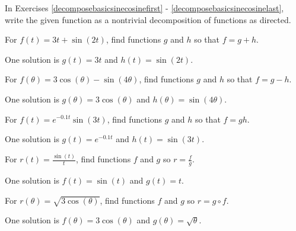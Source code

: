\documentclass{ximera}
\begin{document}
\begin{question}
    
In Exercises \ref{decomposebasicsinecosinefirst} - \ref{decomposebasicsinecosinelast}, write the given function as a nontrivial decomposition of functions as directed.

\begin{problem}\label{decomposebasicsinecosinefirst}
    For $f(t) = 3t + \sin(2t)$, find functions $g$ and $h$ so that $f=g+h$.

\begin{solution}
One solution is $g(t) = 3t$ and $h(t) = \sin(2t)$.
\end{solution}
\end{problem}

\begin{problem}
    For $f(\theta) = 3\cos(\theta) - \sin(4\theta)$, find functions $g$ and $h$ so that $f=g-h$.

\begin{solution}
One solution is $g(\theta) = 3 \cos(\theta)$ and $h(\theta) = \sin(4 \theta)$.
\end{solution}
\end{problem}

\begin{problem}
    For $f(t) = e^{-0.1t} \sin(3t)$, find functions $g$ and $h$ so that $f=gh$.
    
\begin{solution}
One solution is $g(t) =  e^{-0.1t}$ and $h(t) = \sin(3t)$.
\end{solution}
\end{problem}


\begin{problem}
    For $r(t) = \frac{\sin(t)}{t}$, find functions $f$ and $g$ so $r = \frac{f}{g}$.

\begin{solution}
One solution is $f(t) = \sin(t)$ and $g(t) = t$.
\end{solution}
\end{problem}

\begin{problem}\label{decomposebasicsinecosinelast}
    For $r(\theta) =\sqrt{3 \cos(\theta)}$, find functions $f$ and $g$ so $r = g \circ f$.

\begin{solution}
 One solution is $f(\theta) = 3 \cos(\theta)$ and $g(\theta) = \sqrt{\theta}$.
\end{solution}
\end{problem}

\end{question}
\end{document}
